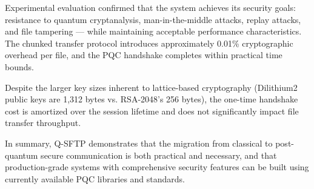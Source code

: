 Experimental evaluation confirmed that the system achieves its security goals: resistance to quantum cryptanalysis, man-in-the-middle attacks, replay attacks, and file tampering — while maintaining acceptable performance characteristics. The chunked transfer protocol introduces approximately 0.01\% cryptographic overhead per file, and the PQC handshake completes within practical time bounds.

Despite the larger key sizes inherent to lattice-based cryptography (Dilithium2 public keys are 1,312 bytes vs. RSA-2048's 256 bytes), the one-time handshake cost is amortized over the session lifetime and does not significantly impact file transfer throughput.

In summary, Q-SFTP demonstrates that the migration from classical to post-quantum secure communication is both practical and necessary, and that production-grade systems with comprehensive security features can be built using currently available PQC libraries and standards.